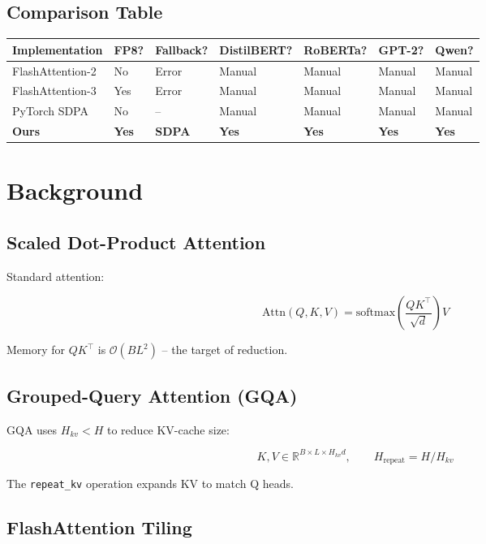 \subsection{Comparison Table}

\begin{table}[H]
\centering
\small
\begin{tabular}{lllllll}
\toprule
\textbf{Implementation} & \textbf{FP8?} & \textbf{Fallback?} & \textbf{DistilBERT?} & \textbf{RoBERTa?} & \textbf{GPT-2?} & \textbf{Qwen?} \\
\midrule
FlashAttention-2 & No & Error & Manual & Manual & Manual & Manual \\
FlashAttention-3 & Yes & Error & Manual & Manual & Manual & Manual \\
PyTorch SDPA & No & -- & Manual & Manual & Manual & Manual \\
\textbf{Ours} & \textbf{Yes} & \textbf{SDPA} & \textbf{Yes} & \textbf{Yes} & \textbf{Yes} & \textbf{Yes} \\
\bottomrule
\end{tabular}
\end{table}




\section{Background}

\subsection{Scaled Dot-Product Attention}

Standard attention:

\[
\text{Attn}(Q, K, V) = \text{softmax}\!\left(\frac{Q K^\top}{\sqrt{d}}\right) V
\tag{3.1}
\]

Memory for $QK^\top$ is $\mathcal{O}(BL^2)$ -- the target of reduction.

\subsection{Grouped-Query Attention (GQA)}

GQA uses $H_{kv} < H$ to reduce KV-cache size:

\[
K, V \in \mathbb{R}^{B \times L \times H_{kv} d}, \qquad
H_{\text{repeat}} = H / H_{kv}
\tag{3.2}
\]

The \texttt{repeat\_kv} operation expands KV to match Q heads.

\subsection{FlashAttention Tiling}

